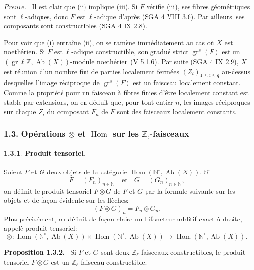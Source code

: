 \documentclass[11pt]{article}
\newenvironment{statement}[1]{\par\medskip\noindent\textbf{#1.}\ }{\par\medskip}
\newenvironment{prooftext}[1][Proof]{\par\noindent\emph{#1.}\ }{\par\medskip}
\DeclareMathOperator{\Hom}{Hom}
\providecommand{\Hom}{\operatorname{Hom}}
\providecommand{\Ab}{\operatorname{Ab}}
\providecommand{\Ab}{\operatorname{Ab}}
\providecommand{\Hom}{\operatorname{Hom}}
\begin{document}
\begin{prooftext}[Preuve]
Il est clair que (ii) implique (iii). Si \(F\) vérifie (iii), ses fibres géométriques sont \(\ell\)-adiques, donc \(F\) est \(\ell\)-adique d'après (SGA 4 VIII 3.6). Par ailleurs, ses composants sont constructibles (SGA 4 IX 2.8).

Pour voir que (i) entraîne (ii), on se ramène immédiatement au cas où \(X\) est noethérien. Si \(F\) est \(\ell\)-adique constructible, son gradué strict \(\operatorname{gr}^s(F)\) est un \((\operatorname{gr}\ell\mathbb Z,\Ab(X))\)-module noethérien (V 5.1.6). Par suite (SGA 4 IX 2.9), \(X\) est réunion d'un nombre fini de parties localement fermées \((Z_i)_{1\le i\le q}\) au-dessus desquelles l'image réciproque de \(\operatorname{gr}^s(F)\) est un faisceau localement constant. Comme la propriété pour un faisceau à fibres finies d'être localement constant est stable par extensions, on en déduit que, pour tout entier \(n\), les images réciproques sur chaque \(Z_i\) du composant \(F_n\) de \(F\) sont des faisceaux localement constants.
\end{prooftext}

\subsubsection*{1.3. Opérations \(\otimes\) et \(\Hom\) sur les \(\mathbb Z_\ell\)-faisceaux}

\paragraph{1.3.1. Produit tensoriel.}
Soient \(F\) et \(G\) deux objets de la catégorie \(\Hom(\mathbb N^\circ,\Ab(X))\). Si
\[
F=(F_n)_{n\in\mathbb N}\quad\text{et}\quad G=(G_n)_{n\in\mathbb N},
\]
on définit le produit tensoriel \(F\otimes G\) de \(F\) et \(G\) par la formule suivante sur les objets et de façon évidente sur les flèches:
\[
(F\otimes G)_n=F_n\otimes G_n.
\]
Plus précisément, on définit de façon claire un bifoncteur additif exact à droite, appelé produit tensoriel:
\[
\otimes:\Hom(\mathbb N^\circ,\Ab(X))\times \Hom(\mathbb N^\circ,\Ab(X))
\longrightarrow \Hom(\mathbb N^\circ,\Ab(X)).
\]

\begin{statement}{Proposition 1.3.2}
Si \(F\) et \(G\) sont deux \(\mathbb Z_\ell\)-faisceaux constructibles, le produit tensoriel \(F\otimes G\) est un \(\mathbb Z_\ell\)-faisceau constructible.
\end{statement}
\end{document}
